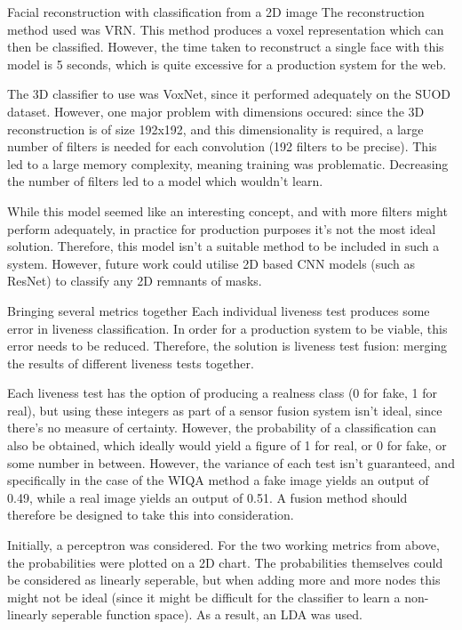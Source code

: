 \documentclass[final]{beamer}
\begin{document}
\begin{frame}{}
\begin{columns}[t]
\begin{column}{.48\linewidth}
\begin{block}{Facial reconstruction with classification from a 2D image}
          The reconstruction method used was VRN. This method produces a voxel representation which can then be classified. However, the time taken to
          reconstruct a single face with this model is 5 seconds, which is quite excessive for a production system for the web.

          The 3D classifier to use was VoxNet, since it performed adequately on the SUOD dataset. However, one major problem with dimensions occured: since the 3D reconstruction
          is of size 192x192, and this dimensionality is required, a large number of filters is needed for each convolution (192 filters to be precise). This led to a large
          memory complexity, meaning training was problematic. Decreasing the number of filters led to a model which wouldn't learn.

          While this model seemed like an interesting concept, and with more filters might perform adequately, in practice for production purposes it's not the most ideal solution.
          Therefore, this model isn't a suitable method to be included in such a system. However, future work could utilise 2D based CNN models (such as ResNet) to classify any 2D remnants of
          masks.
          
        \end{block}

        \begin{block}{Bringing several metrics together}
          Each individual liveness test produces some error in liveness classification. In order for a production system to be viable, this error needs to be reduced. Therefore, the solution is
          liveness test fusion: merging the results of different liveness tests together.

          Each liveness test has the option of producing a realness class (0 for fake, 1 for real), but using these integers as part of a sensor fusion system isn't ideal, since there's no measure
          of certainty. However, the probability of a classification can also be obtained, which ideally would yield a figure of 1 for real, or 0 for fake, or some number in between. However, the variance
          of each test isn't guaranteed, and specifically in the case of the WIQA method a fake image yields an output of 0.49, while a real image yields an output of 0.51. A fusion method should therefore be designed
          to take this into consideration.

          Initially, a perceptron was considered. For the two working metrics from above, the probabilities were plotted on a 2D chart. The probabilities themselves could be considered as linearly seperable, but
          when adding more and more nodes this might not be ideal (since it might be difficult for the classifier to learn a non-linearly seperable function space). As a result, an LDA was used.


\end{block}
\end{column}
\end{columns}
\end{frame}
\end{document}
